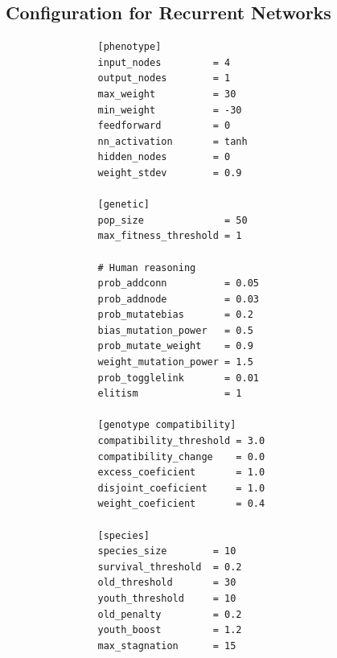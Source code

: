 \documentclass[11pt]{article}
\begin{document}
		\pagebreak
		\subsection{Configuration for Recurrent Networks} %
		\label{sub:configuration_for_recurrent_networks}
			\begin{verbatim}
				[phenotype]
				input_nodes         = 4
				output_nodes        = 1
				max_weight          = 30
				min_weight          = -30
				feedforward         = 0
				nn_activation       = tanh 
				hidden_nodes        = 0
				weight_stdev        = 0.9

				[genetic]
				pop_size              = 50
				max_fitness_threshold = 1

				# Human reasoning
				prob_addconn          = 0.05
				prob_addnode          = 0.03
				prob_mutatebias       = 0.2
				bias_mutation_power   = 0.5
				prob_mutate_weight    = 0.9
				weight_mutation_power = 1.5
				prob_togglelink       = 0.01
				elitism               = 1

				[genotype compatibility]
				compatibility_threshold = 3.0
				compatibility_change    = 0.0
				excess_coeficient       = 1.0
				disjoint_coeficient     = 1.0
				weight_coeficient       = 0.4

				[species]
				species_size        = 10
				survival_threshold  = 0.2
				old_threshold       = 30
				youth_threshold     = 10
				old_penalty         = 0.2
				youth_boost         = 1.2
				max_stagnation      = 15
			\end{verbatim}

	\nocite{*}
	
	
\end{document}
